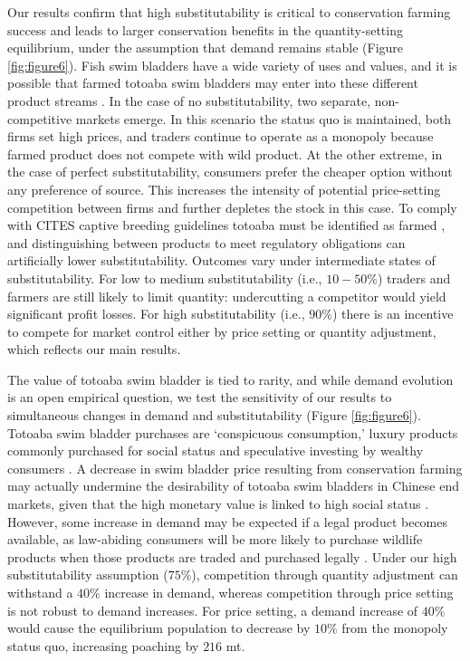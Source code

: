 Our results confirm that high substitutability is critical to conservation farming success and leads to larger conservation benefits in the quantity-setting equilibrium, under the assumption that demand remains stable (Figure \ref{fig:figure6}). Fish swim bladders have a wide variety of uses and values, and it is possible that farmed totoaba swim bladders may enter into these different product streams \citep{sadovy_de_mitcheson_emerging_2019}. In the case of no substitutability, two separate, non-competitive markets emerge. In this scenario the status quo is maintained, both firms set high prices, and traders continue to operate as a monopoly because farmed product does not compete with wild product. At the other extreme, in the case of perfect substitutability, consumers prefer the cheaper option without any preference of source. This increases the intensity of potential price-setting competition between firms and further depletes the stock in this case. To comply with CITES captive breeding guidelines totoaba must be identified as farmed \citep{cites_additional_2019}, and distinguishing between products to meet regulatory obligations can artificially lower substitutability. Outcomes vary under intermediate states of substitutability. For low to medium substitutability (i.e., $10-50\%$) traders and farmers are still likely to limit quantity: undercutting a competitor would yield significant profit losses. For high substitutability (i.e., $90\%$) there is an incentive to compete for market control either by price setting or quantity adjustment, which reflects our main results. 

The value of totoaba swim bladder is tied to rarity, and while demand evolution is an open empirical question, we test the sensitivity of our results to simultaneous changes in demand and substitutability (Figure \ref{fig:figure6}). Totoaba swim bladder purchases are ‘conspicuous consumption,’ luxury products commonly purchased for social status and speculative investing by wealthy consumers \citep{sadovy_de_mitcheson_emerging_2019, veblen_theory_2023}. A decrease in swim bladder price resulting from conservation farming may actually undermine the desirability of totoaba swim bladders in Chinese end markets, given that the high monetary value is linked to high social status \citep{jinkins_conspicuous_2016}. However, some increase in demand may be expected if a legal product becomes available, as law-abiding consumers will be more likely to purchase wildlife products when those products are traded and purchased legally \citep{phelps_framework_2014}. Under our high substitutability assumption ($75\%$), competition through quantity adjustment can withstand a $40\%$ increase in demand, whereas competition through price setting is not robust to demand increases. For price setting, a demand increase of $40\%$ would cause the equilibrium population to decrease by $10\%$ from the monopoly status quo, increasing poaching by $216$ mt. 


